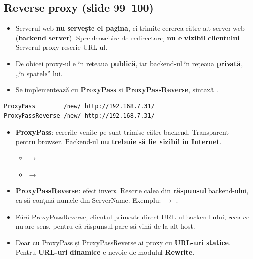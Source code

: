 \documentclass[11pt,a4paper]{article}
\begin{document}
\subsection*{Reverse proxy (slide 99--100)}
\begin{itemize}
  \item Serverul web \textbf{nu servește el pagina}, ci trimite cererea către alt server web (\textbf{backend server}). Spre deosebire de redirectare, \textbf{nu e vizibil clientului}. Serverul proxy rescrie URL-ul.
  \item De obicei proxy-ul e în rețeaua \textbf{publică}, iar backend-ul în rețeaua \textbf{privată}, „în spatele” lui.
  \item Se implementează cu \textbf{ProxyPass} și \textbf{ProxyPassReverse}, sintaxă .
\end{itemize}
\begin{lstlisting}
ProxyPass        /new/ http://192.168.7.31/
ProxyPassReverse /new/ http://192.168.7.31/
\end{lstlisting}
\begin{itemize}
  \item \textbf{ProxyPass}: cererile venite pe  sunt trimise către backend. Transparent pentru browser. Backend-ul \textbf{nu trebuie să fie vizibil în Internet}.
  \begin{itemize}
    \item {} $\rightarrow$ 
    \item {} $\rightarrow$ 
  \end{itemize}
  \item \textbf{ProxyPassReverse}: efect invers. Rescrie calea din \textbf{răspunsul} backend-ului, ca să conțină numele din ServerName. Exemplu:  $\rightarrow$ .
  \item Fără ProxyPassReverse, clientul primește direct URL-ul backend-ului, ceea ce nu are sens, pentru că răspunsul pare să vină de la alt host.
  \item Doar cu ProxyPass și ProxyPassReverse ai proxy cu \textbf{URL-uri statice}. Pentru \textbf{URL-uri dinamice} e nevoie de modulul \textbf{Rewrite}.
\end{itemize}

\end{document}
